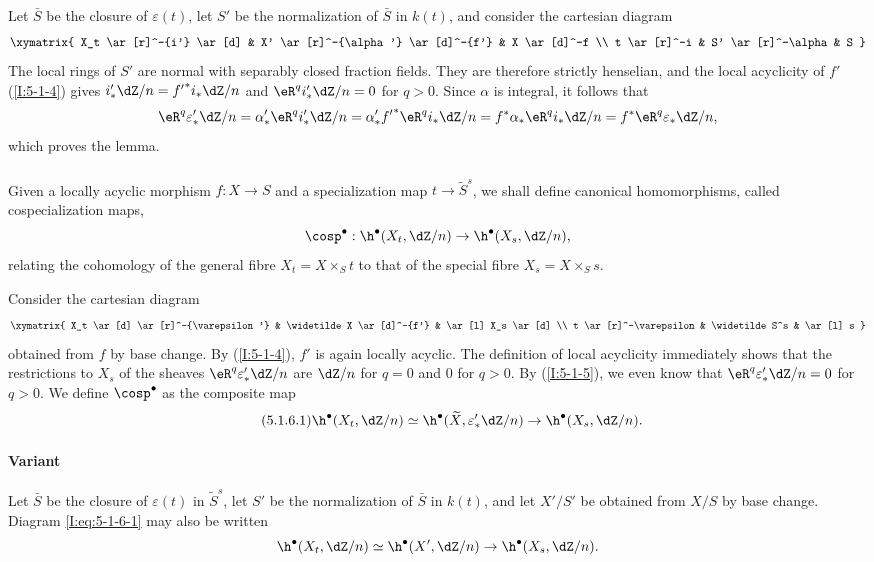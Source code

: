 \documentclass[oneside]{book}
\begin{document}
Let $\bar S$ be the closure of $\varepsilon(t)$, let $S'$ be the
normalization of $\bar S$ in $k(t)$, and consider the cartesian diagram
\[\xymatrix{
  X_t \ar[r]^-{i'} \ar[d]
    & X' \ar[r]^-{\alpha'} \ar[d]^-{f'}
    & X \ar[d]^-f \\
  t \ar[r]^-i
    & S' \ar[r]^-\alpha
    & S
}\]
The local rings of $S'$ are normal with separably closed fraction fields.
They are therefore strictly henselian, and the local acyclicity of $f'$
(\ref{I:5-1-4}) gives
$i'_*\dZ/n={f'}^*i_*\dZ/n$ and $\eR^q i'_*\dZ/n=0$ for $q>0$. Since $\alpha$
is integral, it follows that
\[
  \eR^q\varepsilon_*'\dZ/n
    = \alpha_*' \eR^q i_*' \dZ/n
    = \alpha_*' {f'}^* \eR^q i_* \dZ/n
    = f^* \alpha_* \eR^q i_* \dZ/n
    = f^* \eR^q \varepsilon_* \dZ/n \text{,}
\]
which proves the lemma.

\subsubsection{}\label{I:5-1-6}

Given a locally acyclic morphism $f:X\to S$ and a specialization map
$t\to\widetilde S^s$, we shall define canonical homomorphisms, called
cospecialization maps,
\[
  \cosp^\bullet : \h^\bullet(X_t,\dZ/n) \to \h^\bullet(X_s,\dZ/n)\text{,}
\]
relating the cohomology of the general fibre $X_t=X\times_St$ to that of
the special fibre $X_s=X\times_Ss$.

Consider the cartesian diagram
\[\xymatrix{
  X_t \ar[d] \ar[r]^-{\varepsilon'}
    & \widetilde X \ar[d]^-{f'}
    & \ar[l] X_s \ar[d] \\
  t \ar[r]^-\varepsilon
    & \widetilde S^s
    & \ar[l] s
}\]
obtained from $f$ by base change. By (\ref{I:5-1-4}), $f'$ is again
locally acyclic. The definition of local acyclicity immediately shows that
the restrictions to $X_s$ of the sheaves $\eR^q\varepsilon_*'\dZ/n$ are
$\dZ/n$ for $q=0$ and $0$ for $q>0$. By (\ref{I:5-1-5}), we even know
that $\eR^q\varepsilon_*'\dZ/n=0$ for $q>0$. We define
$\cosp^\bullet$ as the composite map
\begin{equation*}\tag{5.1.6.1}\label{I:eq:5-1-6-1}
  \h^\bullet(X_t,\dZ/n) \simeq \h^\bullet(\widetilde X,\varepsilon_*' \dZ/n) \to \h^\bullet(X_s,\dZ/n) \text{.}
\end{equation*}

\paragraph{Variant}
Let $\bar S$ be the closure of $\varepsilon(t)$ in
$\widetilde S^s$, let $S'$ be the normalization of $\bar S$ in $k(t)$,
and let $X'/S'$ be obtained from $X/S$ by base change. Diagram
\eqref{I:eq:5-1-6-1} may also be written
\[
  \h^\bullet(X_t,\dZ/n) \simeq \h^\bullet(X',\dZ/n) \to \h^\bullet(X_s,\dZ/n) \text{.}
\]
\end{document}
